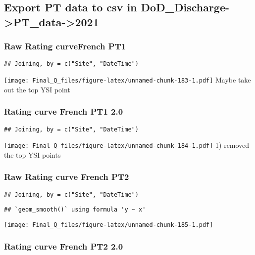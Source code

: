 \documentclass[
]{article}
\begin{document}
\hypertarget{export-pt-data-to-csv-in-dod_discharge-pt_data-2021-1}{%
\subsection{Export PT data to csv in
DoD\_Discharge-\textgreater PT\_data-\textgreater2021}\label{export-pt-data-to-csv-in-dod_discharge-pt_data-2021-1}}

\hypertarget{raw-rating-curvefrench-pt1}{%
\subsubsection{Raw Rating curveFrench
PT1}\label{raw-rating-curvefrench-pt1}}

\begin{verbatim}
## Joining, by = c("Site", "DateTime")
\end{verbatim}

\texttt{[image: Final\_Q\_files/figure-latex/unnamed-chunk-183-1.pdf]}
Maybe take out the top YSI point

\hypertarget{rating-curve-french-pt1-2.0}{%
\subsubsection{Rating curve French PT1
2.0}\label{rating-curve-french-pt1-2.0}}

\begin{verbatim}
## Joining, by = c("Site", "DateTime")
\end{verbatim}

\texttt{[image: Final\_Q\_files/figure-latex/unnamed-chunk-184-1.pdf]} 1)
removed the top YSI points

\hypertarget{raw-rating-curve-french-pt2}{%
\subsubsection{Raw Rating curve French
PT2}\label{raw-rating-curve-french-pt2}}

\begin{verbatim}
## Joining, by = c("Site", "DateTime")
\end{verbatim}

\begin{verbatim}
## `geom_smooth()` using formula 'y ~ x'
\end{verbatim}

\texttt{[image: Final\_Q\_files/figure-latex/unnamed-chunk-185-1.pdf]}

\hypertarget{rating-curve-french-pt2-2.0}{%
\subsubsection{Rating curve French PT2
2.0}\label{rating-curve-french-pt2-2.0}}
\end{document}
